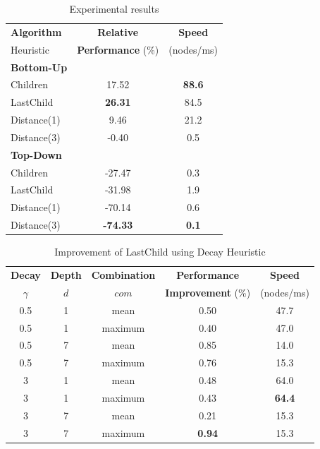 \begin{table}[tb]
\centering
\begin{tabular}{l c c}
\toprule
\textbf{Algorithm} & \textbf{Relative} & \textbf{Speed}\\ 
Heuristic & \textbf{Performance} (\%) & (nodes/ms)\\ 
\midrule

\textbf{Bottom-Up} & & \\
Children & 17.52 & \textbf{88.6} \\ 
LastChild & \textbf{26.31} & 84.5 \\ 
Distance(1) & 9.46 & 21.2 \\ 
Distance(3) & -0.40 & 0.5\\ 

\midrule

\textbf{Top-Down} & & \\
Children & -27.47 & 0.3 \\
LastChild & -31.98 & 1.9 \\
Distance(1) & -70.14 & 0.6 \\ 
Distance(3) & \textbf{-74.33} & \textbf{0.1}\\ 

\bottomrule
\end{tabular}
\caption{Experimental results}
\label{tab:results}
\end{table}

\begin{table}[tb]
\centering


\begin{tabular}{c c c c c}
\toprule
\textbf{Decay} & \textbf{Depth} &  \textbf{Combination} & \textbf{Performance} & \textbf{Speed}\\ 
$\gamma$ &$d$ &  $com$ & \textbf{Improvement} (\%) & (nodes/ms)\\ 
\midrule
0.5&1& mean & 0.50 & 47.7\\ 
0.5& 1& maximum & 0.40 & 47.0 \\
0.5& 7& mean& 0.85 & 14.0 \\
0.5& 7& maximum & 0.76 & 15.3 \\
3&   1& mean & 0.48 & 64.0\\
3&   1& maximum & 0.43 & \textbf{64.4} \\
3&   7& mean & 0.21 & 15.3 \\ 
3&   7& maximum & \textbf{0.94} & 15.3 \\
\bottomrule
\end{tabular}
\caption{Improvement of LastChild using Decay Heuristic}
\label{tab:decay}
\end{table}

